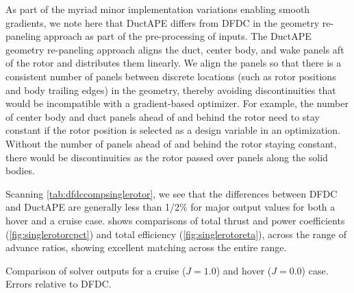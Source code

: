 \noindent As part of the myriad minor implementation variations enabling smooth gradients, we note here that DuctAPE differs from DFDC in the geometry re-paneling approach as part of the pre-processing of inputs.
%
The DuctAPE geometry re-paneling approach aligns the duct, center body, and wake panels aft of the rotor and distributes them linearly.
%
We align the panels so that there is a consistent number of panels between discrete locations (such as rotor positions and body trailing edges) in the geometry, thereby avoiding discontinuities that would be incompatible with a gradient-based optimizer.
%
For example, the number of center body and duct panels ahead of and behind the rotor need to stay constant if the rotor position is selected as a design variable in an optimization.
%
Without the number of panels ahead of and behind the rotor staying constant, there would be discontinuities as the rotor passed over panels along the solid bodies.


Scanning \cref{tab:dfdccompsinglerotor}, we see that the differences between DFDC and DuctAPE are generally less than 1/2\% for major output values for both a hover and a cruise case.
%
 shows comparisons of total thrust and power coefficients (\cref{fig:singlerotorcpct}) and total efficiency (\cref{fig:singlerotoreta}), across the range of advance ratios, showing excellent matching across the entire range.
%

\begin{table}[h!]
    \centering
    \caption[DuctAPE verification value comparison.]{Comparison of solver outputs for a cruise (\(J=1.0\)) and hover (\(J=0.0\)) case. Errors relative to DFDC.}
    \begin{subtable}[t]{\textwidth}
        \begin{center}
            
        \end{center}
    \end{subtable}

    \vspace{1em}

    \begin{subtable}[t]{\textwidth}
        \begin{center}
            
        \end{center}
    \end{subtable}
    \label{tab:dfdccompsinglerotor}
\end{table}

